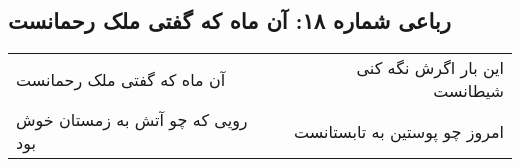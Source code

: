 \begin{center}
\section*{رباعی شماره ۱۸: آن ماه که گفتی ملک رحمانست}
\label{sec:018}
\begin{longtable}{l p{0.5cm} r}
آن ماه که گفتی ملک رحمانست
&&
این بار اگرش نگه کنی شیطانست
\\
رویی که چو آتش به زمستان خوش بود
&&
امروز چو پوستین به تابستانست
\\
\end{longtable}
\end{center}
